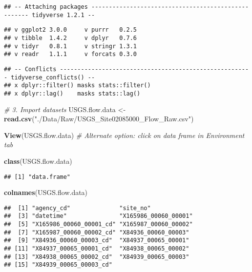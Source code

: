 \documentclass[]{article}
\newenvironment{Shaded}{\begin{snugshade}}{\end{snugshade}}
\newcommand{\KeywordTok}[1]{\textcolor[rgb]{0.13,0.29,0.53}{\textbf{#1}}}
\newcommand{\StringTok}[1]{\textcolor[rgb]{0.31,0.60,0.02}{#1}}
\newcommand{\CommentTok}[1]{\textcolor[rgb]{0.56,0.35,0.01}{\textit{#1}}}
\newcommand{\NormalTok}[1]{#1}
\begin{document}
\begin{verbatim}
## -- Attaching packages ---------------------------------------------------- tidyverse 1.2.1 --
\end{verbatim}

\begin{verbatim}
## v ggplot2 3.0.0     v purrr   0.2.5
## v tibble  1.4.2     v dplyr   0.7.6
## v tidyr   0.8.1     v stringr 1.3.1
## v readr   1.1.1     v forcats 0.3.0
\end{verbatim}

\begin{verbatim}
## -- Conflicts ------------------------------------------------------- tidyverse_conflicts() --
## x dplyr::filter() masks stats::filter()
## x dplyr::lag()    masks stats::lag()
\end{verbatim}

\begin{Shaded}
\begin{Highlighting}[]
\CommentTok{# 3. Import datasets}
\NormalTok{USGS.flow.data <-}\StringTok{ }\KeywordTok{read.csv}\NormalTok{(}\StringTok{"./Data/Raw/USGS_Site02085000_Flow_Raw.csv"}\NormalTok{)}

\KeywordTok{View}\NormalTok{(USGS.flow.data)}
\CommentTok{# Alternate option: click on data frame in Environment tab}

\KeywordTok{class}\NormalTok{(USGS.flow.data)}
\end{Highlighting}
\end{Shaded}

\begin{verbatim}
## [1] "data.frame"
\end{verbatim}

\begin{Shaded}
\begin{Highlighting}[]
\KeywordTok{colnames}\NormalTok{(USGS.flow.data)}
\end{Highlighting}
\end{Shaded}

\begin{verbatim}
##  [1] "agency_cd"              "site_no"               
##  [3] "datetime"               "X165986_00060_00001"   
##  [5] "X165986_00060_00001_cd" "X165987_00060_00002"   
##  [7] "X165987_00060_00002_cd" "X84936_00060_00003"    
##  [9] "X84936_00060_00003_cd"  "X84937_00065_00001"    
## [11] "X84937_00065_00001_cd"  "X84938_00065_00002"    
## [13] "X84938_00065_00002_cd"  "X84939_00065_00003"    
## [15] "X84939_00065_00003_cd"
\end{verbatim}
\end{document}
